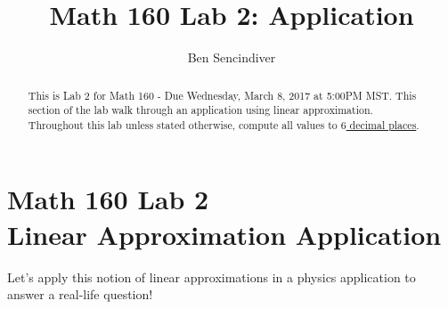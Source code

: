 \documentclass[handout,nooutcomes]{ximera}
\title{Math 160 Lab 2: Application}
\author{Ben Sencindiver} %
\begin{document}
\section{Math 160 Lab 2 \\ Linear Approximation Application}

\begin{abstract}
This is Lab 2 for Math 160 - Due Wednesday, March 8, 2017 at 5:00PM MST.
This section of the lab walk through an application using linear approximation.\\

Throughout this lab unless stated otherwise, compute all values to \underline{$6$ decimal places}.
\end{abstract}

\maketitle



Let's apply this notion of linear approximations in a physics application to
answer a real-life question!\\
\end{document}
